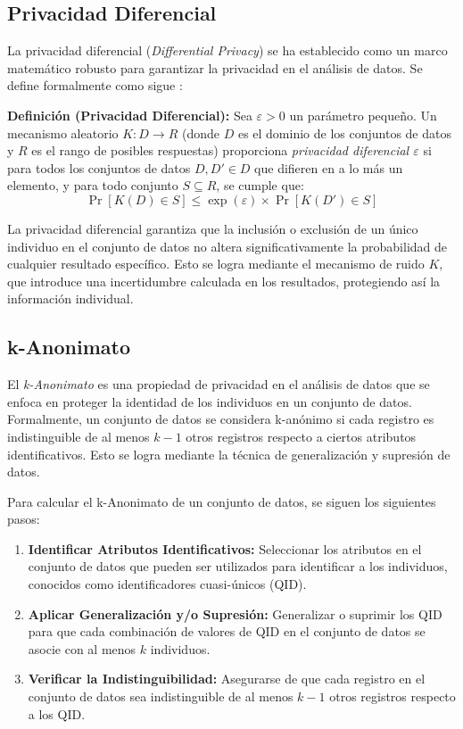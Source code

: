 \subsection{Privacidad Diferencial}
La privacidad diferencial (\emph{Differential Privacy}) se ha establecido como un marco matemático robusto para garantizar la privacidad en el análisis de datos. Se define formalmente como sigue \cite{dwork_differential_2006}:

\textbf{Definición (Privacidad Diferencial):} Sea $\varepsilon > 0$ un parámetro pequeño. Un mecanismo aleatorio $K: D \rightarrow R$ (donde $D$ es el dominio de los conjuntos de datos y $R$ es el rango de posibles respuestas) proporciona \textit{privacidad diferencial $\varepsilon$} si para todos los conjuntos de datos $D, D' \in D$ que difieren en a lo más un elemento, y para todo conjunto $S \subseteq R$, se cumple que:
\begin{equation}
    \Pr[K(D) \in S] \leq \exp(\varepsilon) \times \Pr[K(D') \in S]
\end{equation}


La privacidad diferencial garantiza que la inclusión o exclusión de un único individuo en el conjunto de datos no altera significativamente la probabilidad de cualquier resultado específico. Esto se logra mediante el mecanismo de ruido $K$, que introduce una incertidumbre calculada en los resultados, protegiendo así la información individual.

\subsection{k-Anonimato}

El \textit{k-Anonimato} \cite{jajodia_k-anonymity_2021} es una propiedad de privacidad en el análisis de datos que se enfoca en proteger la identidad de los individuos en un conjunto de datos. Formalmente, un conjunto de datos se considera k-anónimo si cada registro es indistinguible de al menos \( k-1 \) otros registros respecto a ciertos atributos identificativos. Esto se logra mediante la técnica de generalización y supresión de datos.

Para calcular el k-Anonimato de un conjunto de datos, se siguen los siguientes pasos:

\begin{enumerate}
    \item \textbf{Identificar Atributos Identificativos:} Seleccionar los atributos en el conjunto de datos que pueden ser utilizados para identificar a los individuos, conocidos como identificadores cuasi-únicos (QID).
    \item \textbf{Aplicar Generalización y/o Supresión:} Generalizar o suprimir los QID para que cada combinación de valores de QID en el conjunto de datos se asocie con al menos \( k \) individuos.
    \item \textbf{Verificar la Indistinguibilidad:} Asegurarse de que cada registro en el conjunto de datos sea indistinguible de al menos \( k-1 \) otros registros respecto a los QID.
\end{enumerate}

